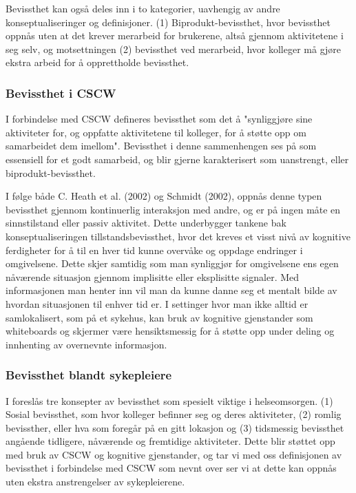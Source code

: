 \noindent
Bevissthet kan også deles inn i to kategorier, uavhengig av andre konseptualiseringer og definisjoner. (1) Biprodukt-bevissthet, hvor bevissthet oppnås uten at det krever merarbeid for brukerene, altså gjennom aktivitetene i seg selv, og motsettningen (2) bevissthet ved merarbeid, hvor kolleger må gjøre ekstra arbeid for å opprettholde bevissthet\cite{Randell10}. 


\subsubsection{Bevissthet i CSCW}
I forbindelse med CSCW defineres bevissthet som det å "synliggjøre sine aktiviteter for, og oppfatte aktivitetene til kolleger, for å støtte opp om samarbeidet dem imellom". Bevissthet i denne sammenhengen ses på som essensiell for et godt samarbeid, og blir gjerne karakterisert som uanstrengt, eller biprodukt-bevissthet\cite{Randell10}. 

\noindent
I følge både C. Heath et al. (2002) og Schmidt (2002), oppnås denne typen bevissthet gjennom kontinuerlig interaksjon med andre, og er på ingen måte en sinnstilstand eller passiv aktivitet. Dette underbygger tankene bak konseptualiseringen tillstandsbevissthet, hvor det kreves et visst nivå av kognitive ferdigheter for å til en hver tid kunne overvåke og oppdage endringer i omgivelsene. Dette skjer samtidig som man synliggjør for omgivelsene ens egen nåværende situasjon gjennom implisitte eller eksplisitte signaler. Med informasjonen man henter inn vil man da kunne danne seg et mentalt bilde av hvordan situasjonen til enhver tid er. I settinger hvor man ikke alltid er samlokalisert, som på et sykehus, kan bruk av kognitive gjenstander som whiteboards og skjermer være hensiktsmessig for å støtte opp under deling og innhenting av overnevnte informasjon\cite{Bardram04}. 

\subsubsection{Bevissthet blandt sykepleiere}
I \cite{Randell10} foreslås tre konsepter av bevissthet som spesielt viktige i helseomsorgen. (1) Sosial bevissthet, som hvor kolleger befinner seg og deres aktiviteter, (2) romlig bevissther, eller hva som foregår på en gitt lokasjon og (3) tidsmessig bevissthet angående tidligere, nåværende og fremtidige aktiviteter. Dette blir støttet opp med bruk av CSCW og kognitive gjenstander, og tar vi med oss definisjonen av bevissthet i forbindelse med CSCW som nevnt over ser vi at dette kan oppnås uten ekstra anstrengelser av sykepleierene.

